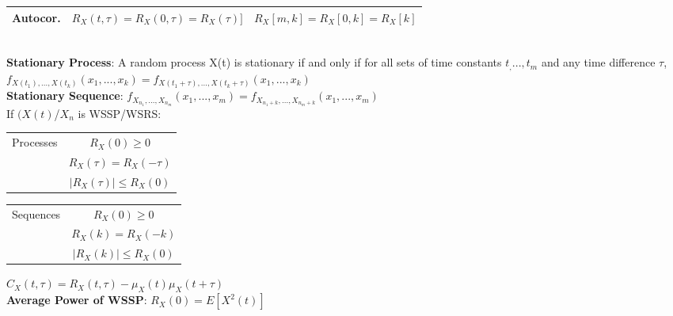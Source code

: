 \documentclass{article}
\begin{document}
\begin{vwcol}[widths={0.63}, sep=.4cm, justify=flush,rule=0pt]
\begin{tabular}{|c|c|c|}
		\hline
		Autocor. & $R_X(t, \tau) = R_X(0, \tau) = R_X(\tau)]$ & $R_X[m, k] = R_X[0, k] = R_X[k]$\\
		\hline
	\end{tabular}\\
	\textbf{Stationary Process}: A random process X(t) is stationary if and only if for all sets of time constants $t_, ... , t_m$ and any time difference $\tau$,  $f_{X(t_1),... ,  X(t_k)}(x_1, ..., x_k) = f_{X(t_1 +\tau),... ,  X(t_k + \tau)}(x_1, ..., x_k)$
	\\
	\textbf{Stationary Sequence}: $f_{X_{n_1},... ,  X_{n_m}}(x_1, ..., x_m) = f_{X_{n_1 + k},... ,  X_{n_m +k}}(x_1, ..., x_m)$\\
	If $(X(t)$/$X_n$ is WSSP/WSRS:\\
	\begin{tabular}{|c|c|}
		\hline
		Processes & $R_X(0) \geq 0$ \\ & $R_X(\tau) = R_X(-\tau)$ \\ & $\vert R_X(\tau) \vert \leq R_X(0)$ \\
		\hline  
	\end{tabular}
	\begin{tabular}{|c|c|}
		\hline
		Sequences & $R_X(0) \geq 0$ \\ & $R_X(k) = R_X(-k)$ \\ & $\vert R_X(k) \vert \leq R_X(0)$ \\
		\hline  
	\end{tabular}
    \end{vwcol}
	\begin{multicols}{2}
    $C_X(t, \tau) = R_X(t, \tau) -\mu_X(t)\mu_X(t + \tau)$\\
	\textbf{Average Power of WSSP}: $R_X(0) = E[X^2(t)]$
	\end{multicols}
\end{document}
